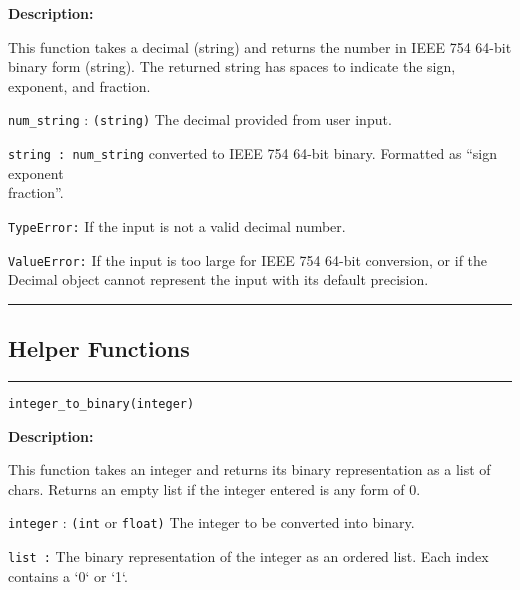 \documentclass[12pt]{article}
\begin{document}
\textbf{Description:}

This function takes a decimal (string) and returns the number in IEEE 754 64-bit binary form (string). The returned string has spaces to indicate the sign, exponent, and fraction.

\begin{description}
    \item[Parameters:] 
    \item \texttt{num\_string} : \texttt{(string)} The decimal provided from user input.

    \item[Returns:] 
    \item \texttt{string : num\_string} converted to IEEE 754 64-bit binary. Formatted as ``sign exponent\\ fraction''.

    \item[Raises:] 
    \item \texttt{TypeError:} If the input is not a valid decimal number.
    \item \texttt{ValueError:} If the input is too large for IEEE 754 64-bit conversion, or if the Decimal object cannot represent the input with its default precision. \\
\end{description}

\hrule
\subsection*{Helper Functions\\}
\hrule
{\large\texttt{integer\_to\_binary(integer)}}

\textbf{Description:}

This function takes an integer and returns its binary representation as a list of chars. Returns an empty list if the integer entered is any form of 0.

\begin{description}
    \item[Parameters:] 
    \item \texttt{integer} : \texttt{(int} or \texttt{float)} The integer to be converted into binary.

    \item[Returns:] 
    \item \texttt{list :} The binary representation of the integer as an ordered list. Each index contains a `0` or `1`.\\
\end{description}
\end{document}
